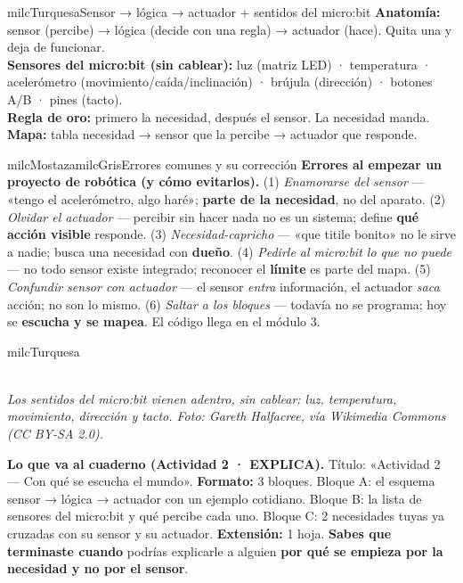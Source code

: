 \documentclass[11pt,letterpaper]{article}
\newcommand{\guiaDiagrama}[2]{%
\begin{center}
\\[1.5mm]
{\footnotesize\itshape\textcolor{milcNegro!75}{#2}}
\end{center}
}
\begin{document}
\begin{drawbox}{milcTurquesa}{Sensor → lógica → actuador + sentidos del micro:bit}
\textbf{Anatomía:} sensor (percibe) → lógica (decide con una regla) → actuador (hace). Quita una y deja de funcionar. \\[1mm]
\textbf{Sensores del micro:bit (sin cablear):} luz (matriz LED) · temperatura · acelerómetro (movimiento/caída/inclinación) · brújula (dirección) · botones A/B · pines (tacto). \\[1mm]
\textbf{Regla de oro:} primero la necesidad, después el sensor. La necesidad manda. \\[1mm]
\textbf{Mapa:} tabla necesidad → sensor que la percibe → actuador que responde.
\end{drawbox}

\begin{softbox}{milcMostaza}{milcGris}{Errores comunes y su corrección}
\textbf{Errores al empezar un proyecto de robótica (y cómo evitarlos).} (1) \emph{Enamorarse del sensor} --- «tengo el acelerómetro, algo haré»; \textbf{parte de la necesidad}, no del aparato. (2) \emph{Olvidar el actuador} --- percibir sin hacer nada no es un sistema; define \textbf{qué acción visible} responde. (3) \emph{Necesidad-capricho} --- «que titile bonito» no le sirve a nadie; busca una necesidad con \textbf{dueño}. (4) \emph{Pedirle al micro:bit lo que no puede} --- no todo sensor existe integrado; reconocer el \textbf{límite} es parte del mapa. (5) \emph{Confundir sensor con actuador} --- el sensor \emph{entra} información, el actuador \emph{saca} acción; no son lo mismo. (6) \emph{Saltar a los bloques} --- todavía no se programa; hoy se \textbf{escucha y se mapea}. El código llega en el módulo 3.
\end{softbox}

\begin{infoband}{milcTurquesa}
\guiaDiagrama{assets/robotica-1/sensores-microbit.tex}{Los sentidos del micro:bit vienen adentro, sin cablear: luz, temperatura, movimiento, dirección y tacto. Foto: Gareth Halfacree, vía Wikimedia Commons (CC BY-SA 2.0).}

\textbf{Lo que va al cuaderno (Actividad 2 · EXPLICA).} Título: «Actividad 2 --- Con qué se escucha el mundo». \textbf{Formato:} 3 bloques. Bloque A: el esquema sensor → lógica → actuador con un ejemplo cotidiano. Bloque B: la lista de sensores del micro:bit y qué percibe cada uno. Bloque C: 2 necesidades tuyas ya cruzadas con su sensor y su actuador. \textbf{Extensión:} 1 hoja. \textbf{Sabes que terminaste cuando} podrías explicarle a alguien \textbf{por qué se empieza por la necesidad y no por el sensor}.
\end{infoband}
\end{document}
